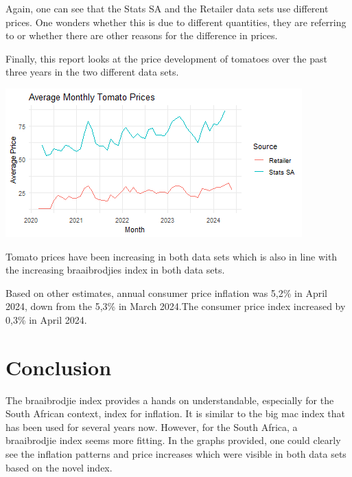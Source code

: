 \documentclass[11pt,preprint, authoryear]{elsarticle}
\let\origfigure\figure
\let\endorigfigure\endfigure
\renewenvironment{figure}[1][2] {
    \expandafter\origfigure\expandafter[H]
} {
    \endorigfigure
}
\numberwithin{equation}{section}
\numberwithin{figure}{section}
\numberwithin{table}{section}
\begin{document}
Again, one can see that the Stats SA and the Retailer data sets use
different prices. One wonders whether this is due to different
quantities, they are referring to or whether there are other reasons for
the difference in prices.

Finally, this report looks at the price development of tomatoes over the
past three years in the two different data sets.

\begin{figure}[H]

{\centering \includegraphics{Question5_files/figure-latex/Figure4-1} 

}

\caption{Tomato Prices over Time \label{Figure4}}\label{fig:Figure4}
\end{figure}

Tomato prices have been increasing in both data sets which is also in
line with the increasing braaibrodjies index in both data sets.

Based on other estimates, annual consumer price inflation was 5,2\% in
April 2024, down from the 5,3\% in March 2024.The consumer price index
increased by 0,3\% in April 2024.

\hypertarget{conclusion}{%
\section{Conclusion}\label{conclusion}}

The braaibrodjie index provides a hands on understandable, especially
for the South African context, index for inflation. It is similar to the
big mac index that has been used for several years now. However, for the
South Africa, a braaibrodjie index seems more fitting. In the graphs
provided, one could clearly see the inflation patterns and price
increases which were visible in both data sets based on the novel index.


\end{document}
